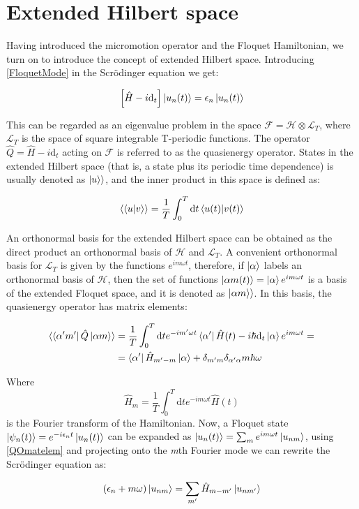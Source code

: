 \section{Extended Hilbert space}

Having introduced the micromotion operator and the Floquet Hamiltonian, we turn on to introduce the concept of extended Hilbert space. Introducing \ref{FloquetMode} in the Scr\"{o}dinger equation we get:

\begin{equation}
\left[ \hat{H}-i\text{d}_t\right] \ket{u_n(t)} = \epsilon_n\ket{u_n(t)}
\end{equation}

This can be regarded as an eigenvalue problem in the space $\mathcal{F}=\mathcal{H}\otimes\mathcal{L}_T$, where $\mathcal{L}_T$ is the space of square integrable T-periodic functions. The operator $\hat{Q} = \hat{H}-i\text{d}_t$ acting on $\mathcal{F}$ is referred to as the quasienergy operator. States in the extended Hilbert space (that is, a state plus its periodic time dependence) is usually denoted as $\ket{u}\rangle$, and the inner product in this space is defined as:

\begin{equation}
\langle \bra{u}\ket{v} \rangle = \frac{1}{T}\int_0^T \text{d}t \bra{u(t)}\ket{v(t)}
\end{equation}

An orthonormal basis for the extended Hilbert space can be obtained as the direct product an orthonormal basis of $\mathcal{H}$ and $\mathcal{L}_T$. A convenient orthonormal basis for $\mathcal{L}_T$ is given by the functions $e^{im\omega t}$, therefore, if $\ket{\alpha}$ labels an orthonormal basis of $\mathcal{H}$, then the set of functions $\ket{\alpha m (t)} = \ket{\alpha}e^{im\omega t}$ is a basis of the extended Floquet space, and it is denoted as $\ket{\alpha m}\rangle$. In this basis, the quasienergy operator has matrix elements:

\begin{align}
\langle \bra{\alpha' m'}\hat{Q}\ket{\alpha m} \rangle &= \frac{1}{T}\int_0^T \text{d}t e^{-im'\omega t}\bra{\alpha'} \hat{H}(t)-i\hbar\text{d}_t \ket{\alpha}e^{im\omega t} = \nonumber \\
&= \bra{\alpha'} \hat{H}_{m'-m} \ket{\alpha} + \delta_{m'm}\delta_{\alpha' \alpha}m\hbar\omega \label{QOmatelem}
\end{align}

Where
\begin{equation}
\hat{H}_m = \frac{1}{T}\int_0^T \text{d}t e^{-im\omega t}\hat{H}(t) 
\end{equation}
is the Fourier transform of the Hamiltonian. Now, a Floquet state $\ket{\psi_n(t)} = e^{-i \epsilon_n t}\ket{u_n(t)}$ can be expanded as $\ket{u_n(t)} = \sum_m e^{im\omega t}\ket{u_{nm}}$, using \ref{QOmatelem} and projecting onto the \textit{m}th Fourier mode we can rewrite the Scr\"{o}dinger equation as:

\begin{equation}
(\epsilon_n+m\omega)\ket{u_{nm}} = \sum_{m'}\hat{H}_{m-m'}\ket{u_{nm'}}
\end{equation}


















